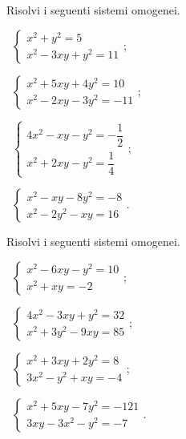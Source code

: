  \begin{esercizio}[\Ast]
\label{ese:6.53}
Risolvi i seguenti sistemi omogenei.
\begin{multicols}{2}
 \begin{enumeratea}
 \item~$\left\{\begin{array}{l}x^2+y^2=5\\x^2-3xy+y^2=11\end{array}\right.$;
 \item~$\left\{\begin{array}{l}x^2+5xy+4y^2=10\\x^2-2xy-3y^2=-11\end{array}\right.$;
 \item~$\left\{\begin{array}{l}4x^2-xy-y^2=-\dfrac 1 2\\x^2+2xy-y^2=\dfrac 1 4\end{array}\right.$;
 \item~$\left\{\begin{array}{l}x^2-xy-8y^2=-8\\x^2-2y^2-xy=16\end{array}\right.$.
 \end{enumeratea}
\end{multicols}
 \end{esercizio}
\pagebreak
\begin{esercizio}[\Ast]
\label{ese:6.54}
Risolvi i seguenti sistemi omogenei.
\begin{multicols}{2}
 \begin{enumeratea}
 \item~$\left\{\begin{array}{l}x^2-6xy-y^2=10\\x^2+xy=-2\end{array}\right.$;
 \item~$\left\{\begin{array}{l}4x^2-3xy+y^2=32\\x^2+3y^2-9xy=85\end{array}\right.$;
 \item~$\left\{\begin{array}{l}x^2+3xy+2y^2=8\\3x^2-y^2+xy=-4\end{array}\right.$;
 \item~$\left\{\begin{array}{l}x^2+5xy-7y^2=-121\\3xy-3x^2-y^2=-7\end{array}\right.$.
 \end{enumeratea}
\end{multicols}
\end{esercizio}


